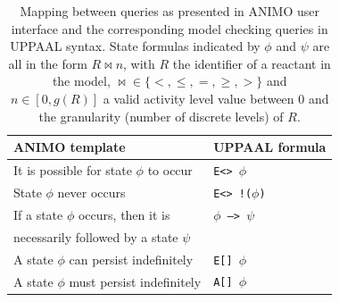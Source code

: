 \documentclass{bmcart}
\begin{document}
\begin{backmatter}
\begin{table}[h!]
\scriptsize
  \begin{center}
    \begin{tabular}{|l|l|}
      \hline
      ANIMO template & UPPAAL formula \\
      \hline
      \hline
      It is possible for state $\phi$ to occur & {\tt E<>\hspace{-1.3mm} $\phi$} \\
      \hline
      State $\phi$ never occurs & {\tt E<>\hspace{-1.3mm} !\hspace{-0.5mm}($\phi$)} \\
      \hline
      If a state $\phi$ occurs, then it is & {\tt $\phi$ --> $\psi$} \\
      necessarily followed by a state $\psi$ & \\
      \hline
      A state $\phi$ can persist indefinitely & {\tt E[]\hspace{-1.3mm} $\phi$} \\
      \hline
      A state $\phi$ must persist indefinitely & {\tt A[]\hspace{-1.3mm} $\phi$} \\
      \hline
    \end{tabular}
  \end{center}
  \caption{Mapping between queries as presented in ANIMO user interface and the corresponding
  model checking queries in UPPAAL syntax. State formulas indicated by $\phi$ and $\psi$ are all in the form
  $R \Join n$, with $R$ the identifier of a reactant in the model, $\Join \in \{<, \leq, =, \geq, >\}$
  and $n \in [0, g(R)]$ a valid activity level value between 0 and the granularity (number of discrete levels) of $R$.
  \label{tab:model-checking-templates}}
\end{table}





\end{backmatter}
\end{document}
